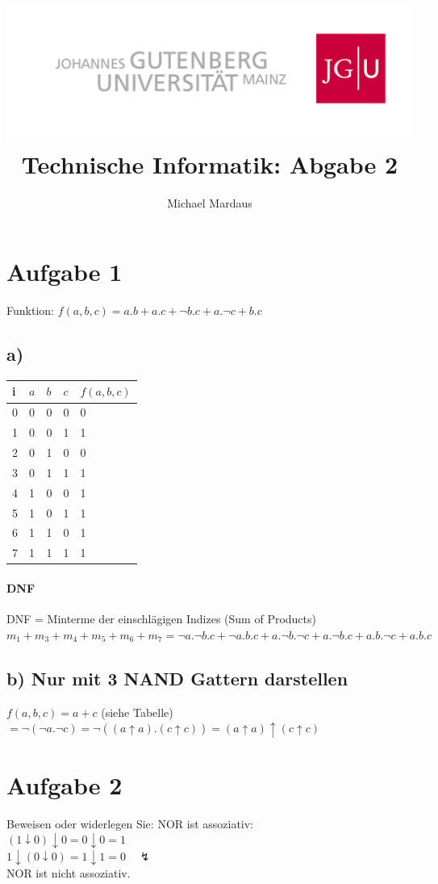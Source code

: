 \documentclass[10pt,a4paper]{scrartcl}
\author{Michael Mardaus}
\title{\includegraphics[scale=0.2]{logo_schriftzug}\\ Technische Informatik:
Abgabe 2}
\begin{document}
\maketitle


\section{Aufgabe 1}
Funktion:
$f(a,b,c)=a.b + a.c + \neg b.c + a.\neg c + b.c$\\
\subsection{a)}
\begin{tabular}{|l||l|l|l||l|}\hline
i & $a$ & $b$ & $c$ & $f(a,b,c)$ \\\hline\hline
0 & 0 & 0 & 0 & 0 \\\hline
1 & 0 & 0 & 1 & 1 \\\hline
2 & 0 & 1 & 0 & 0 \\\hline
3 & 0 & 1 & 1 & 1 \\\hline
4 & 1 & 0 & 0 & 1 \\\hline
5 & 1 & 0 & 1 & 1 \\\hline
6 & 1 & 1 & 0 & 1 \\\hline
7 & 1 & 1 & 1 & 1 \\\hline
\end{tabular} 

\paragraph{DNF}
DNF = Minterme der einschlägigen Indizes (Sum of Products)\\
$m_1 + m_3 + m_4 + m_5 + m_6 + m_7 = \neg a.\neg b.c + \neg a.b.c + a.\neg b.\neg c + a.\neg b.c + a.b.\neg c + a.b.c$

\subsection{b) Nur mit 3 NAND Gattern darstellen}
$f(a,b,c) = a + c$ (siehe Tabelle)\\
$= \neg(\neg a.\neg c) = \neg((a\uparrow a).(c\uparrow c)) = (a\uparrow a) \uparrow (c\uparrow c)$

\section{Aufgabe 2}
Beweisen oder widerlegen Sie: NOR ist assoziativ:\\
$(1 \downarrow 0) \downarrow 0 = 0 \downarrow 0 = 1$\\
$1 \downarrow (0 \downarrow 0) = 1 \downarrow 1 = 0 \quad \lightning$\\
NOR ist nicht assoziativ.
\end{document}
